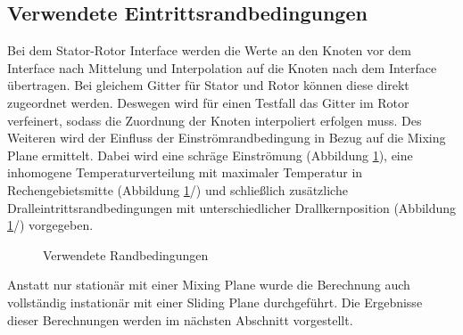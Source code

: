 \subsection{Verwendete Eintrittsrandbedingungen}
\label{subsec:kanalrandbedingungen}
Bei dem Stator-Rotor Interface werden die Werte an den Knoten vor dem Interface nach Mittelung und Interpolation auf die Knoten nach dem Interface übertragen. Bei gleichem Gitter für Stator und Rotor können diese direkt zugeordnet werden. Deswegen wird für einen Testfall das Gitter im Rotor verfeinert, sodass die Zuordnung der Knoten interpoliert erfolgen muss.\newline
Des Weiteren wird der Einfluss der Einströmrandbedingung in Bezug auf die Mixing Plane ermittelt. Dabei wird eine schräge Einströmung (Abbildung \ref{fig:randbedingungen}), eine inhomogene Temperaturverteilung mit maximaler Temperatur in Rechengebietsmitte (Abbildung \ref{fig:randbedingungen}/) und schließlich zusätzliche Dralleintrittsrandbedingungen mit unterschiedlicher Drallkernposition (Abbildung \ref{fig:randbedingungen}/) vorgegeben.
\begin{figure}[htbp]
\centering
\caption{Verwendete Randbedingungen}
\label{fig:randbedingungen}
\end{figure} 
Anstatt nur stationär mit einer Mixing Plane wurde die Berechnung auch vollständig instationär mit einer Sliding Plane durchgeführt. Die Ergebnisse dieser Berechnungen werden im nächsten Abschnitt vorgestellt.
